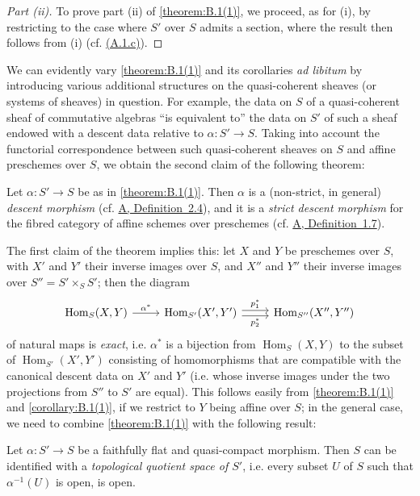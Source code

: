 \documentclass{article}
\theoremstyle{plain}
\newenvironment{theorem}[1]
  {\renewcommand\theinnercustomtheorem{#1}\innercustomtheorem}
  {\endinnercustomtheorem}
\newenvironment{lemma}[1]
  {\renewcommand\theinnercustomlemma{#1}\innercustomlemma}
  {\endinnercustomlemma}
\theoremstyle{definition}
\DeclareMathOperator{\Hom}{Hom}
\newcommand{\oldpage}[1]{\marginpar{\footnotesize$\Big\vert$ \textit{p.~#1}}}
\begin{document}
\begin{proof}[Part (ii)]
To prove part (ii) of \cref{theorem:B.1(1)}, we proceed, as for (i), by restricting to the case where $S'$ over $S$ admits a section, where the result then follows from (i) (cf. \hyperref[A.1.c]{(A.1.c)}).
\end{proof}

We can evidently vary \cref{theorem:B.1(1)} and its corollaries \emph{ad libitum} by introducing various additional structures on the quasi-coherent sheaves (or systems of sheaves) in question.
For example, the data on $S$ of a
\oldpage{190-19}
quasi-coherent sheaf of commutative algebras ``is equivalent to'' the data on $S'$ of such a sheaf endowed with a descent data relative to $\alpha\colon S'\to S$.
Taking into account the functorial correspondence between such quasi-coherent sheaves on $S$ and affine preschemes over $S$, we obtain the second claim of the following theorem:

\begin{theorem}{2}
\label{theorem:B.1(2)}
  Let $\alpha\colon S'\to S$ be as in \cref{theorem:B.1(1)}.
  Then $\alpha$ is a (non-strict, in general) \emph{descent morphism} (cf. \hyperref[definition:A.2.4]{A, Definition~2.4}), and it is a \emph{strict descent morphism} for the fibred category of affine schemes over preschemes (cf. \hyperref[definition:A.1.7]{A, Definition~1.7}).
\end{theorem}

The first claim of the theorem implies this:
let $X$ and $Y$ be preschemes over $S$, with $X'$ and $Y'$ their inverse images over $S$, and $X''$ and $Y''$ their inverse images over $S''=S'\times_S S'$;
then the diagram
\[
  \begin{tikzcd}
    \Hom_S(X,Y) \rar["\alpha^*"]
    & \Hom_{S'}(X',Y') \rar[shift left=1,"p_1^*"] \rar[shift right=1,swap,"p_2^*"]
    & \Hom_{S''}(X'',Y'')
  \end{tikzcd}
\]
of natural maps is \emph{exact}, i.e. $\alpha^*$ is a bijection from $\Hom_S(X,Y)$ to the subset of $\Hom_{S'}(X',Y')$ consisting of homomorphisms that are compatible with the canonical descent data on $X'$ and $Y'$ (i.e. whose inverse images under the two projections from $S''$ to $S'$ are equal).
This follows easily from \cref{theorem:B.1(1)} and \cref{corollary:B.1(1)}, if we restrict to $Y$ being affine over $S$;
in the general case, we need to combine \cref{theorem:B.1(1)} with the following result:

\begin{lemma}{1.2}
\label{lemma:B.1.2}
  Let $\alpha\colon S'\to S$ be a faithfully flat and quasi-compact morphism.
  Then $S$ can be identified with a \emph{topological quotient space of $S'$}, i.e. every subset $U$ of $S$ such that $\alpha^{-1}(U)$ is open, is open.
\end{lemma}
\end{document}
